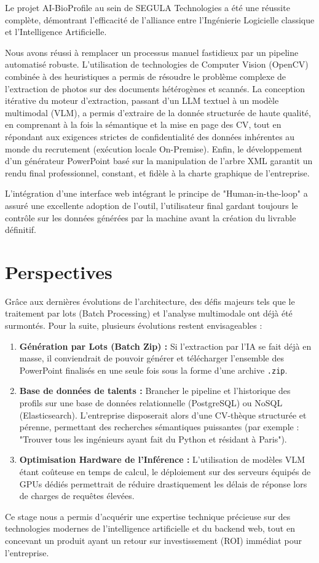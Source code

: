 

Le projet AI-BioProfile au sein de SEGULA Technologies a été une réussite complète, démontrant l'efficacité de l'alliance entre l'Ingénierie Logicielle classique et l'Intelligence Artificielle.

Nous avons réussi à remplacer un processus manuel fastidieux par un pipeline automatisé robuste. L'utilisation de technologies de Computer Vision (OpenCV) combinée à des heuristiques a permis de résoudre le problème complexe de l'extraction de photos sur des documents hétérogènes et scannés. La conception itérative du moteur d'extraction, passant d'un LLM textuel à un modèle multimodal (VLM), a permis d'extraire de la donnée structurée de haute qualité, en comprenant à la fois la sémantique et la mise en page des CV, tout en répondant aux exigences strictes de confidentialité des données inhérentes au monde du recrutement (exécution locale On-Premise). Enfin, le développement d'un générateur PowerPoint basé sur la manipulation de l'arbre XML garantit un rendu final professionnel, constant, et fidèle à la charte graphique de l'entreprise.

L'intégration d'une interface web intégrant le principe de "Human-in-the-loop" a assuré une excellente adoption de l'outil, l'utilisateur final gardant toujours le contrôle sur les données générées par la machine avant la création du livrable définitif.

\section*{Perspectives}
Grâce aux dernières évolutions de l'architecture, des défis majeurs tels que le traitement par lots (Batch Processing) et l'analyse multimodale ont déjà été surmontés. Pour la suite, plusieurs évolutions restent envisageables :
\begin{enumerate}
    \item \textbf{Génération par Lots (Batch Zip) :} Si l'extraction par l'IA se fait déjà en masse, il conviendrait de pouvoir générer et télécharger l'ensemble des PowerPoint finalisés en une seule fois sous la forme d'une archive \texttt{.zip}.
    \item \textbf{Base de données de talents :} Brancher le pipeline et l'historique des profils sur une base de données relationnelle (PostgreSQL) ou NoSQL (Elasticsearch). L'entreprise disposerait alors d'une CV-thèque structurée et pérenne, permettant des recherches sémantiques puissantes (par exemple : "Trouver tous les ingénieurs ayant fait du Python et résidant à Paris").
    \item \textbf{Optimisation Hardware de l'Inférence :} L'utilisation de modèles VLM étant coûteuse en temps de calcul, le déploiement sur des serveurs équipés de GPUs dédiés permettrait de réduire drastiquement les délais de réponse lors de charges de requêtes élevées.
\end{enumerate}

Ce stage nous a permis d'acquérir une expertise technique précieuse sur des technologies modernes de l'intelligence artificielle et du backend web, tout en concevant un produit ayant un retour sur investissement (ROI) immédiat pour l'entreprise.
